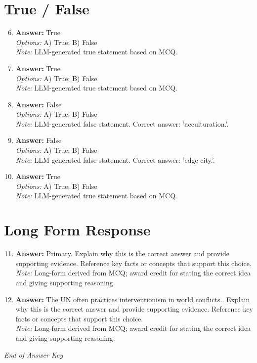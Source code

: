 \documentclass[12pt]{article}
\begin{document}
\section*{True / False}
\begin{enumerate}[label=\arabic*.]
\setcounter{enumi}{5}
\item \textbf{Answer:} True
\\ \textit{Options:} A) True; B) False
\\ \textit{Note:} LLM-generated true statement based on MCQ.
\item \textbf{Answer:} True
\\ \textit{Options:} A) True; B) False
\\ \textit{Note:} LLM-generated true statement based on MCQ.
\item \textbf{Answer:} False
\\ \textit{Options:} A) True; B) False
\\ \textit{Note:} LLM-generated false statement. Correct answer: 'acculturation.'.
\item \textbf{Answer:} False
\\ \textit{Options:} A) True; B) False
\\ \textit{Note:} LLM-generated false statement. Correct answer: 'edge city.'.
\item \textbf{Answer:} True
\\ \textit{Options:} A) True; B) False
\\ \textit{Note:} LLM-generated true statement based on MCQ.
\end{enumerate}

\section*{Long Form Response}
\begin{enumerate}[label=\arabic*.]
\setcounter{enumi}{10}
\item \textbf{Answer:} Primary. Explain why this is the correct answer and provide supporting evidence. Reference key facts or concepts that support this choice.
\\ \textit{Note:} Long-form derived from MCQ; award credit for stating the correct idea and giving supporting reasoning.
\item \textbf{Answer:} The UN often practices interventionism in world conflicts.. Explain why this is the correct answer and provide supporting evidence. Reference key facts or concepts that support this choice.
\\ \textit{Note:} Long-form derived from MCQ; award credit for stating the correct idea and giving supporting reasoning.
\end{enumerate}

\vfill
\noindent\textit{End of Answer Key}
\end{document}
